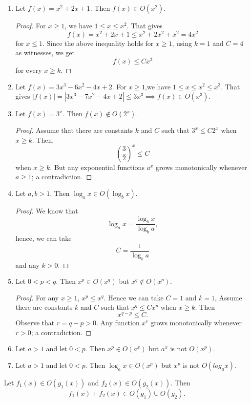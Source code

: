 \begin{example}
    \begin{enumerate}
        \item Let $f(x)=x^2+2x+1$. Then $f(x) \in O(x^2)$.
            \begin{proof}
                For $x\geq 1$, we have $1\leq x\leq x^2$. That gives 
                \[f(x)=x^2+2x+1\leq x^2+2x^2+x^2=4x^2\] for $x\leq1$. Since the above inequality holds for $x\geq1$, using $k=1$ and $C=4$ as witnesses, we get \[f(x)\leq Cx^2\] for every $x\geq k$.
            \end{proof}
        \item Let $f(x)=3x^3-6x^2-4x+2$. For $x\geq1$,we have $1\leq x\leq x^2\leq x^3$. That gives $|f(x)|=|3x^3-7x^2-4x+2|\leq 3x^3 \implies f(x) \in O(x^3)$.
        \item Let $f(x)=3^x$. Then $f(x) \not \in O(2^x)$.
        \begin{proof}
            Assume that there are constants $k$ and $C$ such that $3^x\leq C2^x$ when $x\geq k$. Then, \[\left(\dfrac32\right)^x\leq C\] when $x\geq k$. But any exponential functions $a^x$ grows monotonically whenever $a\geq 1$; a contradiction.
        \end{proof}
        \item Let $a,b>1$. Then $\log_a{x}\in O(\log_b{x})$.
        \begin{proof}
            We know that \[\log_a{x}=\dfrac{\log_b{x}}{\log_b{a}},\] hence, we can take \[C=\dfrac{1}{\log_b{a}}\] and any $k>0$.
        \end{proof}
        \item Let $0<p<q$. Then $x^p\in O(x^q)$ but $x^q \not \in O(x^p)$. 
        \begin{proof}
            For any $x\geq 1$, $x^p\leq x^q$. Hence we can take $C=1$ and $k=1$, Assume there are constants $k$ and $C$ such that $x^q\leq Cx^p$ when $x\geq k$. Then \[x^{q-p}\leq C.\] Observe that $r=q-p>0$. Any function $x^r$ grows monotonically whenever $r>0$; a contradiction.
        \end{proof}
        \item Let $a>1$ and let $0<p$. Then $x^p\in O(a^x)$ but $a^x$ is not $O(x^p)$.
        \item Let $a>1$ and let $0<p$. Then $\log_a{x}\in O(x^p)$ but $x^p$ is not $O(log_a{x})$.
    \end{enumerate}
\end{example}

\begin{theorem}
    Let $f_1(x) \in O(g_1(x))$ and $f_2(x) \in O(g_2(x))$. Then \[ f_1(x)+f_2(x) \in O(g_1) \cup O(g_2). \]
\end{theorem}

